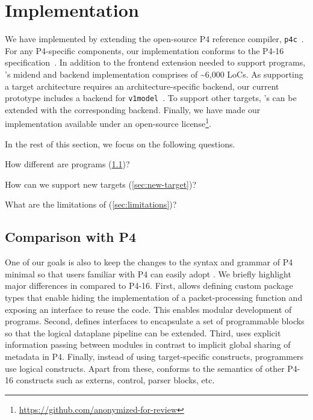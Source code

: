 \documentclass[letterpaper,twocolumn,10pt]{article}
\begin{document}
\section{Implementation}
\label{sec:implementation}
We have implemented \ucomp by extending the open-source P4 reference
compiler, \texttt{p4c}~\cite{p4c}. For any P4-specific components, our
implementation conforms to the P4-16 specification~\cite{p4lang}. In
addition to the frontend extension needed to support \ulang programs,
\ucomp's midend and backend implementation comprises of
\textasciitilde 6,000 LoCs. As supporting a target architecture
requires an architecture-specific backend, our current prototype
includes a backend for \texttt{v1model}~\cite{v1model.p4}. To support
other targets, \ucomp's can be extended with the corresponding
backend. Finally, we have made our implementation available under an
open-source
license\footnote{\url{https://github.com/anonymized-for-review}}.

In the rest of this section, we focus on the following questions.
\begin{enumerate*}[label=(\roman*)]
  \item How different are \ulang programs (\cref{sec:comparison})?
  \item How can we support new targets (\cref{sec:new-target})?
  \item What are the limitations of \ulang (\cref{sec:limitations})?
\end{enumerate*}


\subsection{Comparison with P4}
\label{sec:comparison}
One of our goals is also to keep the changes to the syntax and grammar
of P4 minimal so that users familiar with P4 can easily adopt \ulang.
We briefly highlight major differences in \ulang compared to P4-16.
First, \ulang allows defining custom package types that enable hiding
the implementation of a packet-processing function and exposing an
interface to reuse the code. This enables modular development of
\ulang programs. Second, \uarch defines interfaces to encapsulate a
set of programmable blocks so that the logical dataplane pipeline can
be extended. Third, \uarch uses explicit information passing between
modules in contrast to implicit global sharing of metadata in P4.
Finally, instead of using target-specific constructs, programmers use
logical \uarch constructs. Apart from these, \ulang conforms to the
semantics of other P4-16 constructs such as externs, control, parser
blocks, etc.
\end{document}

